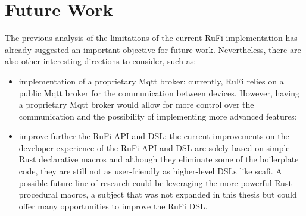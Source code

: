 \section{Future Work}
The previous analysis of the limitations of the current RuFi implementation has already suggested an important objective for future work.
Nevertheless, there are also other interesting directions to consider, such as:

\begin{itemize}
      \item implementation of a proprietary Mqtt broker: currently, RuFi relies on a public Mqtt broker for the communication between devices.
            However, having a proprietary Mqtt broker would allow for more control over the communication and the possibility of implementing more advanced features;
      \item improve further the RuFi API and DSL: the current improvements on the developer experience of the RuFi API and DSL are solely based on simple Rust declarative macros and although they eliminate
            some of the boilerplate code, they are still not as user-friendly as higher-level DSLs like \ac{scafi}. A possible future line of research could be leveraging the more powerful Rust procedural macros, a subject that was not expanded in this thesis
            but could offer many opportunities to improve the RuFi DSL.
\end{itemize}